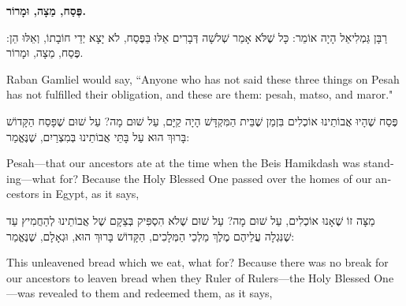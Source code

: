  
\vspace{3em}
 
\begin{center}
{\large \bfseries \textcolor{light-gray}{
פֶּסַח, מַצָה, וּמָרוֹר.
}}
\end{center}
 
 רַבָּן גַּמְלִיאֵל הָיָה אוֹמֵר: כָּל שֶׁלֹּא אָמַר שְׁלשָׁה דְּבָרִים אֵלּוּ בַּפֶּסַח, לֹא יָצָא יְדֵי חוֹבָתוֹ, וְאֵלּוּ הֵן: פֶּסַח, מַצָה, וּמָרוֹר.
 
 \begin{english}
Raban Gamliel would say, ``Anyone who has not said these three things on Pesah has not fulfilled their obligation, and these are them: pesah, matso, and maror."
 \end{english}
 

פֶּסַח שֶׁהָיוּ אֲבוֹתֵינוּ אוֹכְלִים בִּזְמַן שֶׁבֵּית הַמִּקְדָּשׁ הָיָה קַיָּם, עַל שׁוּם מָה? עַל שׁוּם שֶׁפָּסַח הַקָּדוֹשׁ בָּרוּךְ הוּא עַל בָּתֵּי אֲבוֹתֵינוּ בְּמִצְרַיִם, שֶׁנֶּאֱמַר:

\begin{english}
Pesah—that our ancestors ate at the time when the Beis Hamikdash was standing—what for? Because the Holy Blessed One passed over the homes of our ancestors in Egypt, as it says, 
\end{english}


מַצָּה זוֹ שֶׁאָנוּ אוֹכְלִים, עַל שׁוּם מָה? עַל שׁוּם שֶׁלֹא הִסְפִּיק בְּצֵקָם שֶׁל אֲבוֹתֵינוּ לְהַחֲמִיץ עַד שֶׁנִּגְלָה עֲלֵיהֶם מֶלֶךְ מַלְכֵי הַמְּלָכִים, הַקָּדוֹשׁ בָּרוּךְ הוּא, וּגְאָלָם, שֶׁנֶּאֱמַר:

\begin{english}
This unleavened bread which we eat, what for? Because there was no break for our ancestors to leaven bread when they Ruler of Rulers—the Holy Blessed One—was revealed to them and redeemed them, as it says, 
\end{english}

